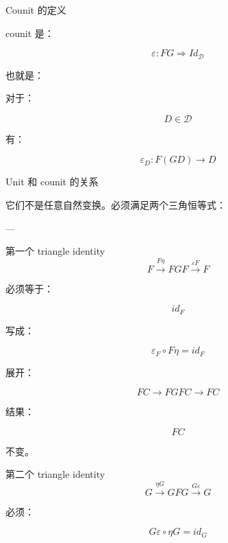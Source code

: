 \documentclass{beamer}
\begin{document}
\begin{frame}[fragile]{Counit 的定义}
\begin{markdown}
counit 是：

$$
\boxed{
\varepsilon:
FG
\Rightarrow
Id_{\mathcal D}
}
$$

也就是：

对于：

$$
D\in\mathcal D
$$

有：

$$
\varepsilon_D:
F(GD)\rightarrow D
$$
\end{markdown}
\end{frame}

\begin{frame}{Unit 和 counit 的关系\cite{ncatlab_triangle_identities}}
\begin{markdown}
它们不是任意自然变换。必须满足两个三角恒等式：

---

第一个 triangle identity
$$
F
\xrightarrow{F\eta}
FGF
\xrightarrow{\varepsilon F}
F
$$

必须等于：

$$
id_F
$$

写成：

$$
\boxed{
\varepsilon_F\circ F\eta=id_F
}
$$

展开：

$$
F C
\rightarrow
FGFC
\rightarrow
FC
$$

结果：

$$
FC
$$

不变。
\end{markdown}
\end{frame}

\begin{frame}[fragile]
\begin{markdown}
第二个 triangle identity
$$
G
\xrightarrow{\eta G}
GFG
\xrightarrow{G\varepsilon}
G
$$

必须：

$$
\boxed{
G\varepsilon\circ\eta G=id_G
}
$$
\end{markdown}
\end{frame}
\end{document}
